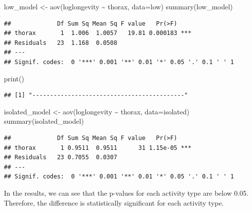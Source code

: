 \documentclass[
]{article}
\newenvironment{Shaded}{\begin{snugshade}}{\end{snugshade}}
\newcommand{\AttributeTok}[1]{\textcolor[rgb]{0.77,0.63,0.00}{#1}}
\newcommand{\FunctionTok}[1]{\textcolor[rgb]{0.00,0.00,0.00}{#1}}
\newcommand{\NormalTok}[1]{#1}
\newcommand{\OtherTok}[1]{\textcolor[rgb]{0.56,0.35,0.01}{#1}}
\newcommand{\SpecialCharTok}[1]{\textcolor[rgb]{0.00,0.00,0.00}{#1}}
\newcommand{\StringTok}[1]{\textcolor[rgb]{0.31,0.60,0.02}{#1}}
\begin{document}
\begin{Shaded}
\begin{Highlighting}[]
\NormalTok{low\_model }\OtherTok{\textless{}{-}} \FunctionTok{aov}\NormalTok{(loglongevity }\SpecialCharTok{\textasciitilde{}}\NormalTok{ thorax, }\AttributeTok{data=}\NormalTok{low)}
\FunctionTok{summary}\NormalTok{(low\_model)}
\end{Highlighting}
\end{Shaded}

\begin{verbatim}
##             Df Sum Sq Mean Sq F value   Pr(>F)    
## thorax       1  1.006  1.0057   19.81 0.000183 ***
## Residuals   23  1.168  0.0508                     
## ---
## Signif. codes:  0 '***' 0.001 '**' 0.01 '*' 0.05 '.' 0.1 ' ' 1
\end{verbatim}

\begin{Shaded}
\begin{Highlighting}[]
\FunctionTok{print}\NormalTok{(}\StringTok{\textquotesingle{}{-}{-}{-}{-}{-}{-}{-}{-}{-}{-}{-}{-}{-}{-}{-}{-}{-}{-}{-}{-}{-}{-}{-}{-}{-}{-}{-}{-}{-}{-}{-}{-}{-}{-}{-}{-}{-}{-}{-}{-}{-}{-}{-}\textquotesingle{}}\NormalTok{)}
\end{Highlighting}
\end{Shaded}

\begin{verbatim}
## [1] "-------------------------------------------"
\end{verbatim}

\begin{Shaded}
\begin{Highlighting}[]
\NormalTok{isolated\_model }\OtherTok{\textless{}{-}} \FunctionTok{aov}\NormalTok{(loglongevity }\SpecialCharTok{\textasciitilde{}}\NormalTok{ thorax, }\AttributeTok{data=}\NormalTok{isolated)}
\FunctionTok{summary}\NormalTok{(isolated\_model)}
\end{Highlighting}
\end{Shaded}

\begin{verbatim}
##             Df Sum Sq Mean Sq F value   Pr(>F)    
## thorax       1 0.9511  0.9511      31 1.15e-05 ***
## Residuals   23 0.7055  0.0307                     
## ---
## Signif. codes:  0 '***' 0.001 '**' 0.01 '*' 0.05 '.' 0.1 ' ' 1
\end{verbatim}

In the results, we can see that the p-values for each activity type are
below 0.05. Therefore, the difference is statistically significant for
each activity type.
\end{document}
